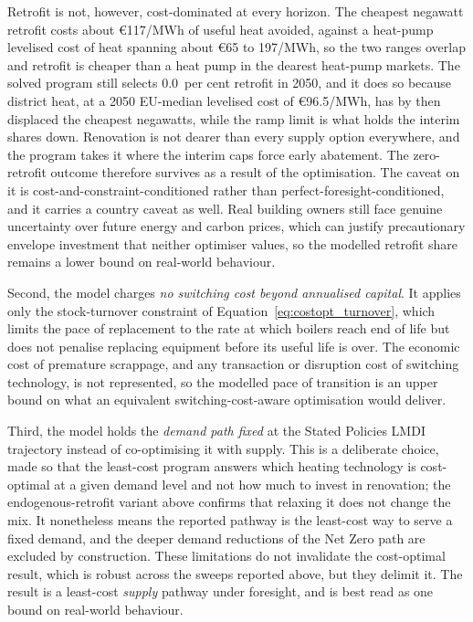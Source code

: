 Retrofit is not, however, cost-dominated at every horizon. The cheapest negawatt retrofit costs about \euro{}117/MWh of useful
heat avoided, against a heat-pump levelised cost of heat spanning about
\euro{}65 to 197/MWh, so the two ranges overlap and retrofit is cheaper than a heat
pump in the dearest heat-pump markets. The solved program still selects 0.0~per cent retrofit in 2050, and it does so because district heat, at a 2050 EU-median levelised cost of \euro{}96.5/MWh, has by then displaced the cheapest negawatts, while the ramp limit is what holds the interim shares down. Renovation is not dearer than every supply option everywhere, and the program takes it where the interim caps force early abatement. The zero-retrofit outcome therefore survives as a result of the optimisation. The caveat on it
is cost-and-constraint-conditioned rather than perfect-foresight-conditioned, and it
carries a country caveat as well. Real building owners
still face genuine uncertainty over future energy and carbon prices, which can
justify precautionary envelope investment that neither optimiser values, so the
modelled retrofit share remains a lower bound on real-world behaviour.

Second, the model charges \emph{no switching cost beyond annualised capital}. It
applies only the stock-turnover constraint of
Equation~\eqref{eq:costopt_turnover}, which limits the pace of replacement to the
rate at which boilers reach end of life but does not penalise replacing equipment
before its useful life is over. The economic cost of premature scrappage, and any
transaction or disruption cost of switching technology, is not represented, so the
modelled pace of transition is an upper bound on what an equivalent
switching-cost-aware optimisation would deliver.

Third, the model holds the \emph{demand path fixed} at the Stated Policies LMDI
trajectory instead of co-optimising it with supply. This is a deliberate choice,
made so that the least-cost program answers which heating technology is cost-optimal at
a given demand level and not how much to invest in renovation; the
endogenous-retrofit variant above confirms that relaxing it does not change the
mix. It nonetheless means the reported pathway is the least-cost way to serve a fixed demand, and the deeper demand
reductions of the Net Zero path are excluded by construction. These limitations do
not invalidate the cost-optimal result, which is robust across the sweeps reported
above, but they delimit it. The result is a least-cost \emph{supply} pathway under
foresight, and is best read as one bound on real-world behaviour.

